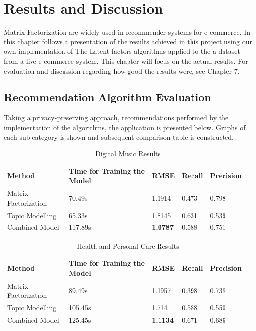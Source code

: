 \chapter{Results and Discussion}
Matrix Factorization are widely used in recommender systems for e-commerce. In this chapter follows a presentation of the results achieved in this project using our own implementation of The Latent factors algorithms applied to the a dataset from a live e-commerce system. This chapter will focus on the actual results. For evaluation and discussion regarding how good the results were, see Chapter 7.

\section{Recommendation Algorithm Evaluation}
Taking a privacy-preserving approach, recommendations performed by the implementation of the algorithms, the application is presented below. Graphs of each sub category is shown and subsequent comparison table is constructed.

\begin{table}[h]
\centering
\begin{tabular}{ llllll }
\toprule
\textbf{Method} & \textbf{Time for Training the Model} & \textbf{RMSE} & \textbf{Recall} & \textbf{Precision}  \\
\midrule
Matrix Factorization & 70.49s & 1.1914 & 0.473 & 0.798  \\
\hline
Topic Modelling & 65.33s & 1.8145 & 0.631 & 0.539 \\
\hline
Combined Model & 117.89s  & \textbf{1.0787} & 0.588 & 0.751 \\ 
\bottomrule
\end{tabular}
\caption{Digital Music Results}
\label{Digital Music Results}
\end{table}



\begin{table}[h]
\centering
\begin{tabular}{ llllll }
\toprule
\textbf{Method} & \textbf{Time for Training the Model} & \textbf{RMSE} & \textbf{Recall} & \textbf{Precision}  \\
\midrule
Matrix Factorization & 89.49s & 1.1957 & 0.398 & 0.738  \\
\hline
Topic Modelling & 105.45s & 1.714 & 0.588 & 0.550 \\
\hline
Combined Model & 125.45s  & \textbf{1.1134} & 0.671 & 0.686 \\ 
\bottomrule        
\end{tabular}
\caption{Health and Personal Care Results}
\end{table}


